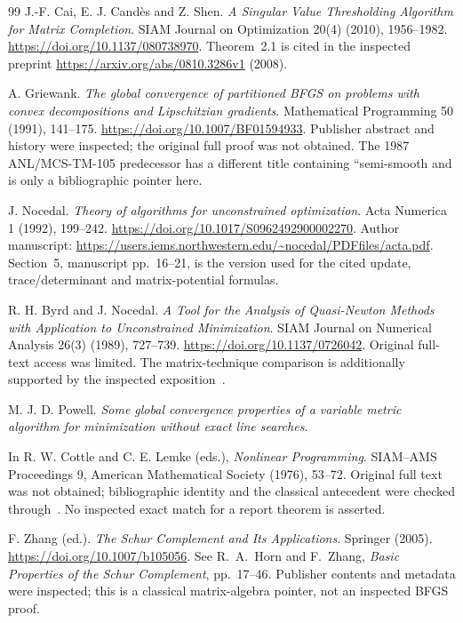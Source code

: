 \begin{thebibliography}{99}
J.-F. Cai, E. J. Cand\`es and Z. Shen. \emph{A Singular Value Thresholding Algorithm for Matrix Completion}. SIAM Journal on Optimization 20(4) (2010), 1956--1982. \url{https://doi.org/10.1137/080738970}. Theorem~2.1 is cited in the inspected preprint \url{https://arxiv.org/abs/0810.3286v1} (2008).

A. Griewank. \emph{The global convergence of partitioned BFGS on problems with convex decompositions and Lipschitzian gradients}. Mathematical Programming 50 (1991), 141--175. \url{https://doi.org/10.1007/BF01594933}. Publisher abstract and history were inspected; the original full proof was not obtained. The 1987 ANL/MCS-TM-105 predecessor has a different title containing ``semi-smooth and is only a bibliographic pointer here.

J. Nocedal. \emph{Theory of algorithms for unconstrained optimization}. Acta Numerica 1 (1992), 199--242. \url{https://doi.org/10.1017/S0962492900002270}. Author manuscript: \url{https://users.iems.northwestern.edu/~nocedal/PDFfiles/acta.pdf}. Section~5, manuscript pp.~16--21, is the version used for the cited update, trace/determinant and matrix-potential formulas.

R. H. Byrd and J. Nocedal. \emph{A Tool for the Analysis of Quasi-Newton Methods with Application to Unconstrained Minimization}. SIAM Journal on Numerical Analysis 26(3) (1989), 727--739. \url{https://doi.org/10.1137/0726042}. Original full-text access was limited. The matrix-technique comparison is additionally supported by the inspected exposition~\cite{FND_N92}.

M. J. D. Powell. \emph{Some global convergence properties of a variable metric algorithm for minimization without exact line searches}.\par
In R. W. Cottle and C. E. Lemke (eds.), \emph{Nonlinear Programming}. SIAM--AMS Proceedings 9, American Mathematical Society (1976), 53--72. Original full text was not obtained; bibliographic identity and the classical antecedent were checked through~\cite{FND_BN89,FND_N92,GL18}. No inspected exact match for a report theorem is asserted.

F. Zhang (ed.). \emph{The Schur Complement and Its Applications}. Springer (2005). \url{https://doi.org/10.1007/b105056}. See R.~A.~Horn and F.~Zhang, \emph{Basic Properties of the Schur Complement}, pp.~17--46. Publisher contents and metadata were inspected; this is a classical matrix-algebra pointer, not an inspected BFGS proof.


\end{thebibliography}
